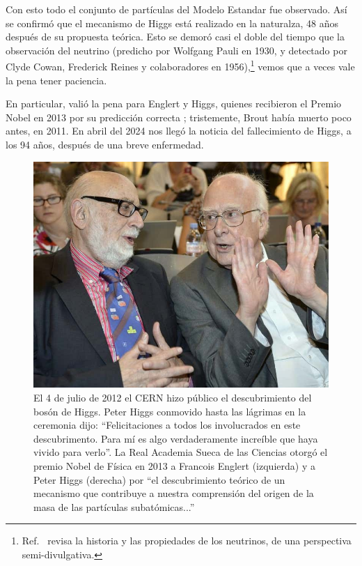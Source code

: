 Con esto todo el conjunto de part\'iculas del Modelo Estandar
fue observado. As\'i se confirm\'o que el mecanismo de Higgs
est\'a realizado en la naturalza, 48 a\~nos despu\'es de su
propuesta te\'orica. Esto se demor\'o casi el doble del tiempo
que la observaci\'on del neutrino (predicho por Wolfgang Pauli en 1930, y
detectado por Clyde Cowan, Frederick Reines y colaboradores en
1956),\footnote{Ref.\ \cite{neutrinos} revisa la historia y las
propiedades de los neutrinos, de una perspectiva semi-divulgativa.}
vemos que a veces vale la pena tener paciencia.

En particular, vali\'o la pena para Englert y Higgs, quienes recibieron
el Premio Nobel en 2013 por su predicci\'on correcta \cite{Nobel13};
tristemente, Brout hab\'ia muerto poco antes, en 2011.
En abril del 2024 nos lleg\'o la noticia del fallecimiento de Higgs,
a los 94 a\~nos, despu\'es de una breve enfermedad.





\begin{figure}
\centering
\includegraphics[scale=.3]{images/higgs_englert2.jpeg}
\caption{El 4 de julio de 2012 el CERN hizo p\'ublico el descubrimiento del bos\'on de Higgs. Peter Higgs conmovido hasta las l\'agrimas en la ceremonia dijo: ``Felicitaciones a todos los involucrados en este descubrimento. Para m\'i es algo verdaderamente incre\'ible que haya vivido para verlo''. La Real Academia Sueca de las Ciencias otorg\'o el premio Nobel de F\'isica en 2013 a Francois Englert (izquierda) y a Peter Higgs (derecha) por ``el descubrimiento te\'orico de un mecanismo que contribuye a nuestra comprensi\'on del origen de la masa de las part\'iculas subat\'omicas...'' }
\end{figure}